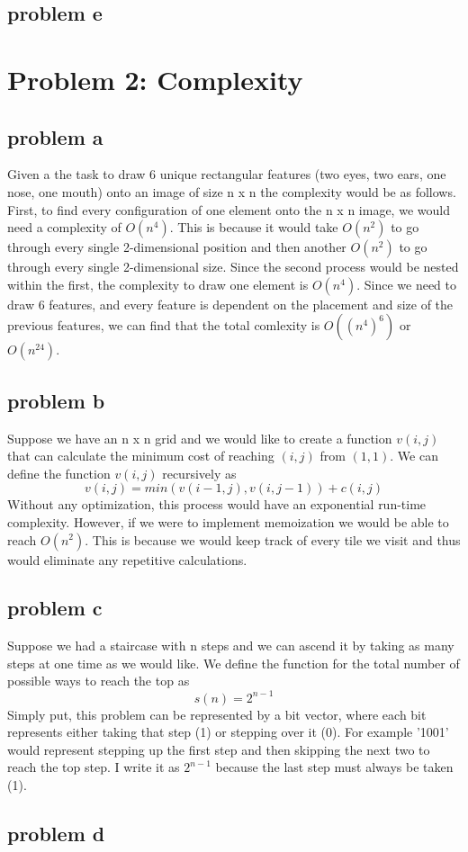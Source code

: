 \documentclass{article}
\begin{document}
\subsection{problem e}

\section{Problem 2: Complexity}
\subsection{problem a}

Given a the task to draw 6 unique rectangular features (two eyes, two ears, one nose, one mouth) onto an image of size n x n the complexity would be as follows. First, to find every configuration of one element onto the n x n image, we would need a complexity of $O(n^4)$. This is because it would take $O(n^2)$ to go through every single 2-dimensional position and then another $O(n^2)$ to go through every single 2-dimensional size. Since the second process would be nested within the first, the complexity to draw one element is $O(n^4)$. Since we need to draw 6 features, and every feature is dependent on the placement and size of the previous features, we can find that the total comlexity is $O((n^4)^6)$ or $O(n^{24})$.

\subsection{problem b}
Suppose we have an n x n grid and we would like to create a function $v(i,j)$ that can calculate the minimum cost of reaching $(i,j)$ from $(1,1)$. We can define the function $v(i,j)$ recursively as
\begin{equation}
  v(i,j) = min(v(i-1,j), v(i,j-1)) + c(i,j)
\end{equation}
Without any optimization, this process would have an exponential run-time complexity. However, if we were to implement memoization we would be able to reach $O(n^2)$. This is because we would keep track of every tile we visit and thus would eliminate any repetitive calculations.

\subsection{problem c}
Suppose we had a staircase with n steps and we can ascend it by taking as many steps at one time as we would like. We define the function for the total number of possible ways to reach the top as
\begin{equation}
  s(n) = 2^{n-1}
\end{equation}
Simply put, this problem can be represented by a bit vector, where each bit represents either taking that step (1) or stepping over it (0). For example '1001' would represent stepping up the first step and then skipping the next two to reach the top step. I write it as $2^{n-1}$ because the last step must always be taken (1).

\subsection{problem d}
\end{document}
